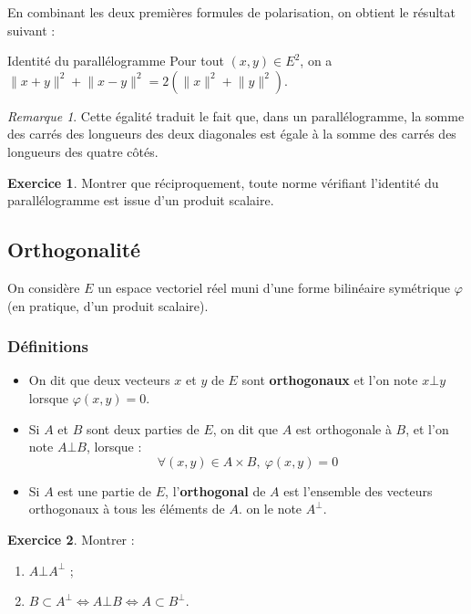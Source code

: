 \documentclass[french]{article}
\theoremstyle{plain}
\theoremstyle{definition}
\newtheorem{exo}{Exercice}
\theoremstyle{remark}
\newtheorem*{rmq}{Remarque}
\begin{document}
En combinant les deux premières formules de polarisation, on obtient le résultat suivant : 

\begin{thm}{Identité du parallélogramme}
	Pour tout $(x,y)\in E^2$, on a $\lVert x+y\rVert^2+\lVert x-y\rVert^2=2(\lVert x\rVert^2+\lVert y\rVert^2)$.
\end{thm}

\begin{rmq}
	Cette égalité traduit le fait que, dans un parallélogramme, la somme des carrés des longueurs des deux diagonales est égale à la somme des carrés des longueurs des quatre côtés.
\end{rmq}

\begin{exo}
	Montrer que réciproquement, toute norme vérifiant l'identité du parallélogramme est issue d'un produit scalaire.
\end{exo}

\subsection{Orthogonalité}
On considère $E$ un espace vectoriel réel muni d'une forme bilinéaire symétrique $\varphi$ (en pratique, d'un produit scalaire).
\subsubsection*{Définitions}

\begin{dfn}
	\begin{itemize}
		\item On dit que deux vecteurs $x$ et $y$ de $E$ sont \textbf{orthogonaux} et l'on note $x\bot y$ lorsque $\varphi(x,y)=0$.
		\item Si $A$ et $B$ sont deux parties de $E$, on dit que $A$ est orthogonale à $B$, et l'on note $A\bot B$, lorsque : $$\forall (x,y)\in A\times B,\ \varphi(x,y)=0$$
		\item Si $A$ est une partie de $E$, l'\textbf{orthogonal} de $A$ est l'ensemble des vecteurs orthogonaux à tous les éléments de $A$. on le note $A^\bot$.
	\end{itemize}
\end{dfn}

\begin{exo}
	Montrer : 
	\begin{enumerate}
		\item $A\bot A^\bot$ ;
		\item $B\subset A^\bot \iff A\bot B\iff A\subset B^\bot$.
	\end{enumerate}
\end{exo}
\end{document}
